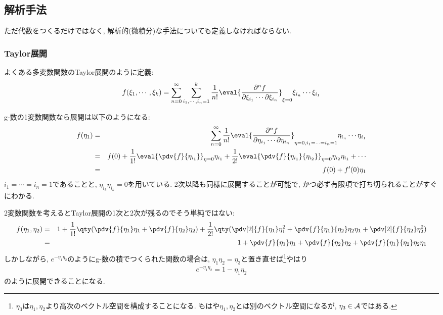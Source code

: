 \documentclass[10.5pt,a4paper]{jreport}
\begin{document}
\subsection{解析手法}
ただ代数をつくるだけではなく, 解析的(微積分)な手法についても定義しなければならない.
\subsubsection{Taylor展開}
よくある多変数関数のTaylor展開のように定義:
\begin{eqnarray}
  f(\xi_1, \cdots, \xi_k) = \sum_{n=0}^\infty\sum_{i_1, \cdots, i_n = 1}^k\frac{1}{n!}\eval{\frac{\partial^nf}{\partial\xi_{i_1}\cdots\partial\xi_{i_n}}}_{\xi=0}\xi_{i_n}\cdots\xi_{i_1}
\end{eqnarray}

g-数の1変数関数なら展開は以下のようになる:
\begin{eqnarray}
  f(\eta_1) &=& \sum_{n=0}^\infty \frac{1}{n!}\eval{\frac{\partial^nf}{\partial\eta_{i_1}\cdots\partial\eta_{i_n}}}_{\eta=0, i_1 = \cdots = i_n = 1}\eta_{i_n}\cdots\eta_{i_1}\\
  &=& f(0) + \frac{1}{1!}\eval{\pdv{f}{\eta_{i_1}}}_{\eta = 0}\eta_{i_1} + \frac{1}{2!}\eval{\pdv{f}{\eta_{i_1}}{\eta_{i_2}}}_{\eta = 0}\eta_{i_2}\eta_{i_1} + \cdots\\
  &=& f(0) + f'(0)\eta_1
\end{eqnarray}
$i_1 = \cdots = i_n = 1$であることと, $\eta_{i_k}\eta_{i_k} = 0$を用いている. 2次以降も同様に展開することが可能で, かつ必ず有限項で打ち切られることがすぐにわかる.

2変数関数を考えるとTaylor展開の1次と2次が残るのでそう単純ではない:
\begin{eqnarray}
  f(\eta_1, \eta_2) &=& 1 + \frac{1}{1!}\qty(\pdv{f}{\eta_1}\eta_1 + \pdv{f}{\eta_2}\eta_2) + \frac{1}{2!}\qty(\pdv[2]{f}{\eta_1}\eta_1^2 + \pdv{f}{\eta_1}{\eta_2}\eta_2\eta_1 + \pdv[2]{f}{\eta_2}\eta_2^2)\\
  &=&1 + \pdv{f}{\eta_1}\eta_1 + \pdv{f}{\eta_2}\eta_2 + \pdv{f}{\eta_1}{\eta_2}\eta_2\eta_1
\end{eqnarray}
しかしながら, $e^{-\eta_1\eta_2}$のようにg-数の積でつくられた関数の場合は, $\eta_1\eta_2 = \eta_3$と置き直せば\footnote{$\eta_3$は$\eta_1, \eta_2$より高次のベクトル空間を構成することになる. もはや$\eta_1, \eta_2$とは別のベクトル空間になるが, $\eta_3\in{\cal A}$ではある. }やはり
\begin{eqnarray}
  e^{-\eta_1\eta_2} = 1 - \eta_1\eta_2\label{exp-taylor}
\end{eqnarray}
のように展開できることになる. 
\end{document}
